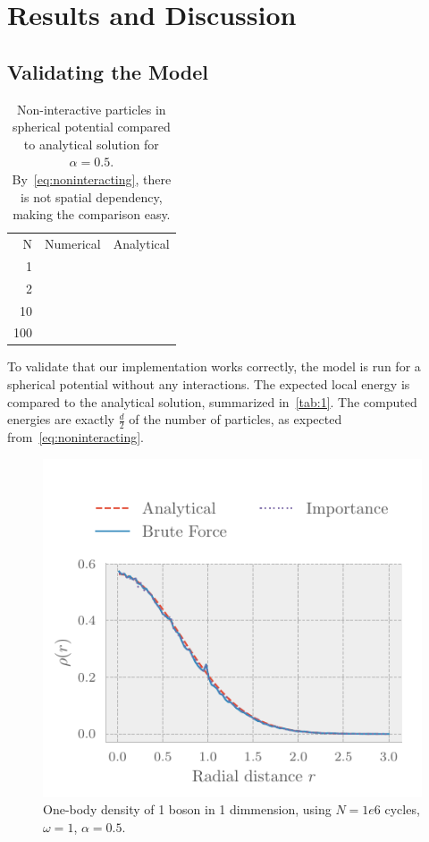 \section{Results and Discussion}\label{sec:Discussion}
\subsection{Validating the Model}

\begin{table}[ht]
  \begin{tabular}{r|cc}
    \toprule
    N & Numerical & Analytical \\
    1 &           &           \\
    2 &           &           \\
    10 &           &           \\
    100 &           &           \\
    \bottomrule
  \end{tabular}
  \caption{Non-interactive particles in spherical potential compared to analytical
    solution for \(\alpha = 0.5\). By~\eqref{eq:noninteracting}, there is not
    spatial dependency, making the comparison easy.}
  \label{tab:1}
\end{table}

To validate that our implementation works correctly, the model is run for a
spherical potential without any interactions. The expected local energy is
compared to the analytical solution, summarized in~\vref{tab:1}. The
computed energies are exactly \(\frac{d}{2}\) of the number of particles, as
expected from~\vref{eq:noninteracting}.

\begin{figure}[ht]
  \centering
  \includegraphics[]{figures/density1.pdf}
  \caption{One-body density of 1 boson in 1 dimmension, using $N = 1e6$ cycles, $\omega = 1$, $\alpha = 0.5$.}
  \label{fig:1 part 1 dim density}
\end{figure}

